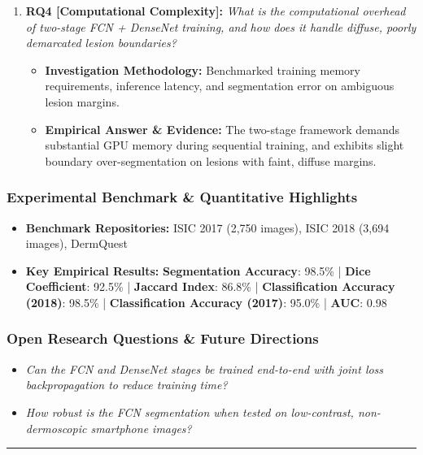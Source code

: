 \begin{enumerate}[label=\textbf{\arabic*.}, leftmargin=*]
\begin{itemize}[leftmargin=1.5em]
  \end{itemize}
  \item \textbf{RQ4 [Computational Complexity]:} \textit{What is the computational overhead of two-stage FCN + DenseNet training, and how does it handle diffuse, poorly demarcated lesion boundaries?}
  \begin{itemize}[leftmargin=1.5em]
    \item \textbf{Investigation Methodology:} Benchmarked training memory requirements, inference latency, and segmentation error on ambiguous lesion margins.
    \item \textbf{Empirical Answer \& Evidence:} The two-stage framework demands substantial GPU memory during sequential training, and exhibits slight boundary over-segmentation on lesions with faint, diffuse margins.
  \end{itemize}
\end{enumerate}

\subsubsection*{Experimental Benchmark \& Quantitative Highlights}
\begin{itemize}[leftmargin=*]
  \item \textbf{Benchmark Repositories:} ISIC 2017 (2,750 images), ISIC 2018 (3,694 images), DermQuest
  \item \textbf{Key Empirical Results:} \textbf{Segmentation Accuracy}: 98.5\% \quad | \quad \textbf{Dice Coefficient}: 92.5\% \quad | \quad \textbf{Jaccard Index}: 86.8\% \quad | \quad \textbf{Classification Accuracy (2018)}: 98.5\% \quad | \quad \textbf{Classification Accuracy (2017)}: 95.0\% \quad | \quad \textbf{AUC}: 0.98
\end{itemize}

\subsubsection*{Open Research Questions \& Future Directions}
\begin{itemize}[leftmargin=*]
  \item \textit{Can the FCN and DenseNet stages be trained end-to-end with joint loss backpropagation to reduce training time?}
  \item \textit{How robust is the FCN segmentation when tested on low-contrast, non-dermoscopic smartphone images?}
\end{itemize}
\vspace{0.8em}\hrule\vspace{1.2em}
